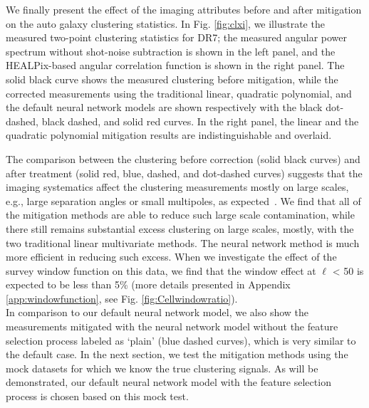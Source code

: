 We finally present the effect of the imaging attributes before and after mitigation on the auto galaxy clustering statistics. In Fig. \ref{fig:clxi}, we illustrate the measured two-point clustering statistics for DR7; the measured angular power spectrum without shot-noise subtraction is shown in the left panel, and the HEALPix-based angular correlation function is shown in the right panel. The solid black curve shows the measured clustering before mitigation, while the corrected measurements using the traditional linear, quadratic polynomial, and the default neural network models are shown respectively with the black dot-dashed, black dashed, and solid red curves. In the right panel, the linear and the quadratic polynomial mitigation results are indistinguishable and overlaid.\\ 



The comparison between the clustering before correction (solid black curves) and  after treatment (solid red, blue, dashed, and dot-dashed curves) suggests that the imaging systematics affect the clustering measurements mostly on large scales, e.g., large separation angles or small multipoles, as expected~\citep[see e.g.,][]{myers2007clustering, ross2007higher, huterer2013calibration}. We find that all of the mitigation methods are able to reduce such large scale contamination, while there still remains substantial excess clustering on large scales, mostly, with the two traditional linear multivariate methods. The neural network method is much more efficient in reducing such excess. When we investigate the effect of the survey window function on this data, we find that the window effect at $\ell$ < 50 is expected to be less than 5\% (more details presented in Appendix \ref{app:windowfunction}, see Fig. \ref{fig:Cellwindowratio}).\\

In comparison to our default neural network model, we also show the measurements mitigated with the neural network model without the feature selection process labeled as `plain' (blue dashed curves), which is very similar to the default case. In the next section, we test the mitigation methods using the mock datasets for which we know the true clustering signals. As will be demonstrated, our default neural network model with the feature selection process is chosen based on this mock test.

